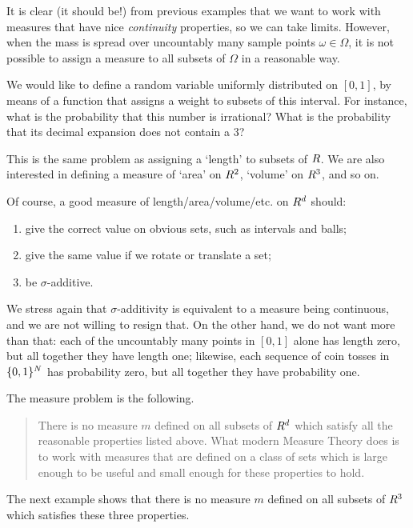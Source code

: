 \documentclass[
]{book}
\let\mathbb\relax %
\newcommand{\N}{\mathbb{N}}
\newcommand{\R}{\mathbb{R}}
\theoremstyle{definition}
\theoremstyle{definition}
\theoremstyle{definition}
\theoremstyle{definition}
\theoremstyle{remark}
\begin{document}
It is clear (it should be!) from previous examples that we want to work
with measures that have nice \emph{continuity} properties, so we can take
limits. However, when the mass is spread over uncountably many sample
points \(\omega \in \Omega\), it is not possible to assign a measure to
all subsets of \(\Omega\) in a reasonable way.

We would like to define a random variable uniformly distributed on
\([0,1]\), by means of a function that assigns a weight to subsets of this
interval. For instance, what is the probability that this number is
irrational? What is the probability that its decimal expansion does not
contain a 3?

This is the same problem as assigning a `length' to subsets of \(\R\). We
are also interested in defining a measure of `area' on \(\R^2\), `volume'
on \(\R^3\), and so on.

Of course, a good measure of length/area/volume/etc. on \(\R^d\) should:

\begin{enumerate}
\def\labelenumi{\arabic{enumi}.}
\item
  give the correct value on obvious sets, such as intervals and balls;
\item
  give the same value if we rotate or translate a set;
\item
  be \(\sigma\)-additive.
\end{enumerate}

We stress again that \(\sigma\)-additivity is equivalent to a measure being
continuous, and we are not willing to resign that. On the other hand, we
do not want more than that: each of the uncountably many points in
\([0,1]\) alone has length zero, but all together they have length one;
likewise, each sequence of coin tosses in \(\{0,1\}^{\N}\) has probability
zero, but all together they have probability one.

The measure problem is the following.

\begin{quote}
There is no measure \(m\) defined on all subsets of \(\R^d\) which satisfy
all the reasonable properties listed above. What modern Measure Theory
does is to work with measures that are defined on a class of sets which
is large enough to be useful and small enough for these properties to
hold.
\end{quote}

The next example shows that there is no measure \(m\) defined on all
subsets of \(\R^3\) which satisfies these three properties.
\end{document}
